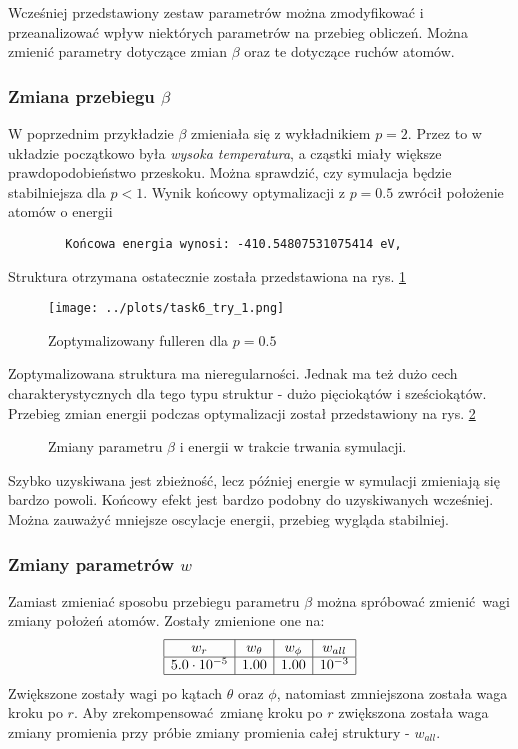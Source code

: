 \documentclass[a4paper,12pt]{article}
\begin{document}
	Wcześniej przedstawiony zestaw parametrów można zmodyfikować i przeanalizować wpływ niektórych parametrów na przebieg obliczeń. 
	Można zmienić parametry dotyczące zmian $\beta$ oraz te dotyczące ruchów atomów.  
	
	\subsubsection*{Zmiana przebiegu $\beta$}
	
	W poprzednim przykładzie $\beta$ zmieniała się z wykładnikiem $p = 2$. 
	Przez to w układzie początkowo była \textit{wysoka temperatura}, a cząstki miały większe prawdopodobieństwo przeskoku. 
	Można sprawdzić, czy symulacja będzie stabilniejsza dla $p < 1$.
	Wynik końcowy optymalizacji z $p = 0.5$ zwrócił położenie atomów o energii
	\begin{verbatim}
		Końcowa energia wynosi: -410.54807531075414 eV,
	\end{verbatim}
	Struktura otrzymana ostatecznie została przedstawiona na rys. \ref{task6_optim}
		\begin{figure}[h]
		\centering
		\texttt{[image: ../plots/task6\_try\_1.png]}
		\caption{Zoptymalizowany fulleren dla $p = 0.5$}
		\label{task6_optim}
	\end{figure}
	
	\noindent Zoptymalizowana struktura ma nieregularności.
	Jednak ma też dużo cech charakterystycznych dla tego typu struktur - dużo pięciokątów i sześciokątów.
	Przebieg zmian energii podczas optymalizacji został przedstawiony na rys. \ref{task6_beta}
	
	\begin{figure}[H]
		\centering
		
		\caption{Zmiany parametru $\beta$ i energii w trakcie trwania symulacji.}
		\label{task6_beta}
	\end{figure}
	
	\noindent Szybko uzyskiwana jest zbieżność, lecz później energie w symulacji zmieniają się bardzo powoli.
	Końcowy efekt jest bardzo podobny do uzyskiwanych wcześniej.
	Można zauważyć mniejsze oscylacje energii, przebieg wygląda stabilniej.
	
	\subsubsection*{Zmiany parametrów $w$}
	
	Zamiast zmieniać sposobu przebiegu parametru $\beta$ można spróbować zmienić wagi zmiany położeń atomów.
	Zostały zmienione one na:
	\[
	\begin{array}{|c|c|c|c|}
		\hline 
		w_r & w_\theta & w_\phi & w_{all} \\ \hline
		5.0\cdot 10^{-5} & 1.00 & 1.00 & 10^{-3} \\ \hline
	\end{array}
	\]
	Zwiększone zostały wagi po kątach $\theta$ oraz $\phi$, natomiast zmniejszona została waga kroku po $r$. 
	Aby zrekompensować zmianę kroku po $r$ zwiększona została waga zmiany promienia przy próbie zmiany promienia całej struktury - $w_{all}$.
	
\end{document}
